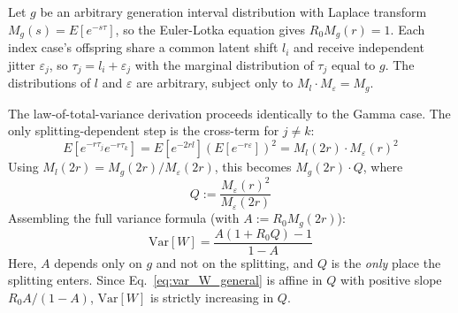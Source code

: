  Let $g$ be an arbitrary generation interval distribution with Laplace transform $M_g(s) = E[e^{-s\tau}]$, so the Euler-Lotka equation gives $R_0 M_g(r) = 1$. Each index case's offspring share a common latent shift $l_i$ and receive independent jitter $\varepsilon_j$, so $\tau_j = l_i + \varepsilon_j$ with the marginal distribution of $\tau_j$ equal to $g$. The distributions of $l$ and $\varepsilon$ are arbitrary, subject only to $M_l \cdot M_\varepsilon = M_g$.

 The law-of-total-variance derivation proceeds identically to the Gamma case. The only splitting-dependent step is the cross-term for $j \neq k$:
\[
E[e^{-r \tau_j} e^{-r \tau_k}] = E[e^{-2rl}] (E[e^{-r\varepsilon}])^2 = M_l(2r) \cdot M_\varepsilon(r)^2
\]
Using $M_l(2r) = M_g(2r) / M_\varepsilon(2r)$, this becomes $M_g(2r) \cdot Q$, where
\begin{equation}
	Q := \frac{M_\varepsilon(r)^2}{M_\varepsilon(2r)}
	\label{eq:Q_def}
\end{equation}
Assembling the full variance formula (with $A := R_0 M_g(2r)$):
\begin{equation}
	\text{Var}[W] = \frac{A(1 + R_0 Q) - 1}{1 - A}
	\label{eq:var_W_general}
\end{equation}
Here, $A$ depends only on $g$ and not on the splitting, and $Q$ is the \emph{only} place the splitting enters. Since Eq.~\ref{eq:var_W_general} is affine in $Q$ with positive slope $R_0 A / (1-A)$, $\text{Var}[W]$ is strictly increasing in $Q$.


